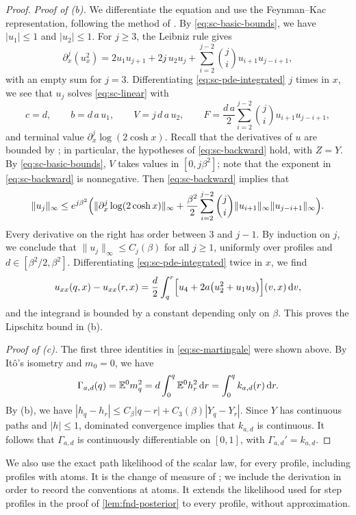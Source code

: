 \begin{proof}
\emph{Proof of (b).} We differentiate the equation and use the
Feynman--Kac representation, following the method of
\cite[Lemma~16]{JagannathTobasco2016}. By \eqref{eq:sc-basic-bounds}, we have
$|u_1|\le1$ and $|u_2|\le1$. For $j\ge3$, the Leibniz rule gives
\[
 \partial_x^j(u_x^2)=2u_1u_{j+1}+2j\,u_2u_j
 +\sum_{i=2}^{j-2}\binom ji u_{i+1}u_{j-i+1},
\]
with an empty sum for $j=3$. Differentiating
\eqref{eq:sc-pde-integrated} $j$ times in $x$, we see that $u_j$ solves
\eqref{eq:sc-linear} with
\[
 c=d,\qquad b=d\,a\,u_1,\qquad V=j\,d\,a\,u_2,\qquad
 F=\frac{d\,a}2\sum_{i=2}^{j-2}\binom ji u_{i+1}u_{j-i+1},
\]
and terminal value $\partial_x^j\log(2\cosh x)$. Recall that the
derivatives of $u$ are bounded by \cite[Proposition~2.1]{Lopatto}; in
particular, the hypotheses of \eqref{eq:sc-backward} hold, with $Z=Y$.
By \eqref{eq:sc-basic-bounds}, $V$ takes values in $[0,j\beta^2]$; note
that the exponent in \eqref{eq:sc-backward} is nonnegative. Then
\eqref{eq:sc-backward} implies that
\[
 \|u_j\|_\infty\le e^{j\beta^2}\Bigl(
 \|\partial_x^j\log(2\cosh x)\|_\infty
 +\frac{\beta^2}2\sum_{i=2}^{j-2}\binom ji
          \|u_{i+1}\|_\infty\|u_{j-i+1}\|_\infty\Bigr).
\]
Every derivative on the right has order between $3$ and $j-1$. By
induction on $j$, we conclude that $\|u_j\|_\infty\le C_j(\beta)$ for
all $j\ge1$, uniformly over profiles and $d\in[\beta^2/2,\beta^2]$.
Differentiating \eqref{eq:sc-pde-integrated} twice in $x$, we find
\[
 u_{xx}(q,x)-u_{xx}(r,x)=\frac d2\int_q^r
 \Bigl[u_4+2a\bigl(u_2^2+u_1u_3\bigr)\Bigr](v,x)\,\mathrm d v,
\]
and the integrand is bounded by a constant depending only on $\beta$.
This proves the Lipschitz bound in (b).

\emph{Proof of (c).} The first three identities in
\eqref{eq:sc-martingale} were shown above. By Itô's isometry and
$m_0=0$, we have
\[
 \Gamma_{a,d}(q)=\mathbb E^0m_q^2=d\int_0^q\mathbb E^0h_r^2\,\mathrm d r
 =\int_0^qk_{a,d}(r)\,\mathrm d r .
\]
By (b), we have $|h_q-h_r|\le C_\beta|q-r|+C_3(\beta)|Y_q-Y_r|$. Since
$Y$ has continuous paths and $|h|\le1$, dominated convergence implies
that $k_{a,d}$ is continuous. It follows that $\Gamma_{a,d}$ is
continuously differentiable on $[0,1]$, with $\Gamma_{a,d}'=k_{a,d}$.
\end{proof}

We also use the exact path likelihood of the scalar law, for every
profile, including profiles with atoms. It is the change of measure of
\cite[Lemma~8.5 and Corollary~8.7]{JagannathTobasco2017PhaseDiagram};
we include the derivation in order to record the conventions at atoms.
It extends the likelihood used for step profiles in the proof of
\cref{lem:fnd-posterior} to every profile, without approximation.


